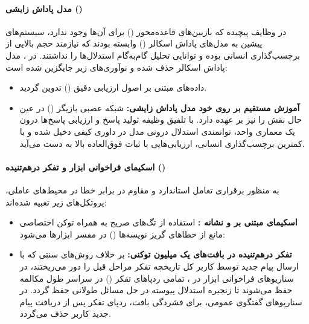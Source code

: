 \paragraph*{مدل پاداش زایشی ()}
در وظایف پیچیده که بازبین‌های قاعده‌محور () برای آن‌ها وجود ندارد، سیستم‌های پیشین به مدل‌های پاداش اسکالر () وابسته بودند که نیازمند حجم بالایی از برچسب‌گذاری انسانی بوده و توانایی تحلیل گام‌به‌گام استدلال‌ها را نداشتند. در ، مدل پاداش اسکالر حذف شده و نوآوری‌های زیر جایگزین شده است:
\begin{itemize}
    \item داده‌های مبتنی بر اصول ارزیابی دقیق () تدوین گردید.
    \item \textbf{آموزش مستقیم  بر روی خود مدل پاداش زایشی:} شبکه عصبی بازیگر () در عین حال نقش  را نیز بر عهده دارد. با تلفیق وظیفه تولید پاسخ و ارزیابی پاسخ‌ها درون یک معماری واحد، توانمندی استدلال درونی مدل در داوری کیفی دخیل شده و با کمترین برچسب‌گذاری انسانی، ارزیابی‌هایی با ثبات فوق‌العاده بالا به دست می‌آید.
\end{itemize}

\paragraph*{اسکیمای فراخوانی ابزار و تفکر درهم‌تنیده ()}
به منظور برقراری تعامل استاندارد و مقاوم در برابر خطا در محیط‌های عاملی، پروتکل‌های زیر تعبیه شده‌اند:
\begin{itemize}
    \item \textbf{اسکیمای مبتنی بر  و نشانه :} استفاده از تگ‌های صریح  به همراه توکن اختصاصی  مانع از خطاهای گریز نویسه‌ها () در مفسر ابزارها می‌شود:
\begin{center}
\end{center}
    \item \textbf{تفکر درهم‌تنیده در بافت‌های یک میلیون توکنی:} بر خلاف روش‌های سنتی که با ارسال پیام جدید توسط کاربر کل تاریخچه تفکر مراحل قبل را دور می‌ریختند، در سناریوهای فراخوانی ابزار در ، تمامی ردپاهای تفکر () در سراسر طول مکالمه حفظ می‌شوند تا زنجیره استدلال پیوسته در حل مسائل طولانی حفظ گردد. در سناریوهای گفتگوی عمومی، برای فشردگی بافت، ردپای تفکر پس از دریافت پیام جدید کاربر حذف می‌گردد.
\end{itemize}

